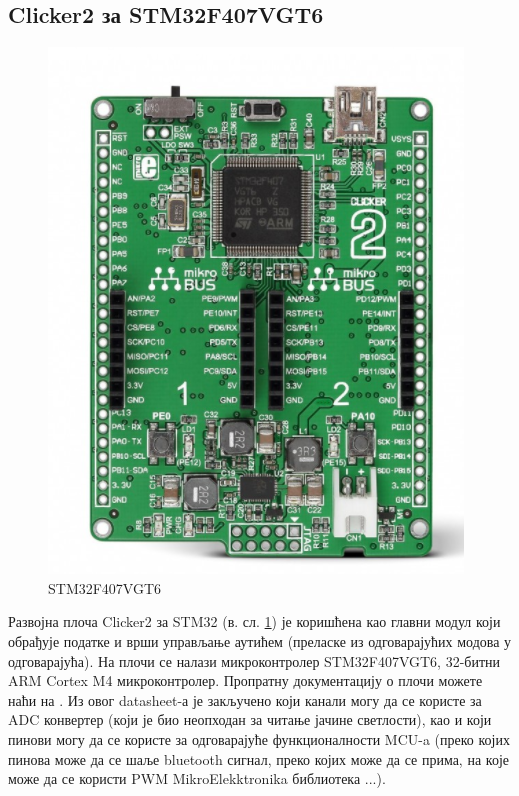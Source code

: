 \subsection{Clicker2 за STM32F407VGT6}
	\begin{figure}[htb!]
		\begin{center}
			\includegraphics[scale=1]{pictures/STM32}
			\caption{STM32F407VGT6}\label{fig:STM32}
		\end{center}
	\end{figure}
Развојна плоча Clicker2 за STM32 (в. сл. \ref{fig:STM32}) је коришћена као главни модул који обрађује податке и врши управљање аутићем (преласке из одговарајућих модова у одговарајућа). На плочи се налази микроконтролер  STM32F407VGT6, 32-битни ARM Cortex M4 микроконтролер. Пропратну документацију о плочи можете наћи на \cite{STM32ST}. Из овог datasheet-а је закључено који канали могу да се користе за ADC конвертер (који је био неопходан за читање јачине светлости), као и који пинови могу да се користе за одговарајуће функционалности MCU-a (преко којих пинова може да се шаље bluetooth сигнал, преко којих може да се прима, на које може да се користи PWM MikroElekktronika библиотека ...).

